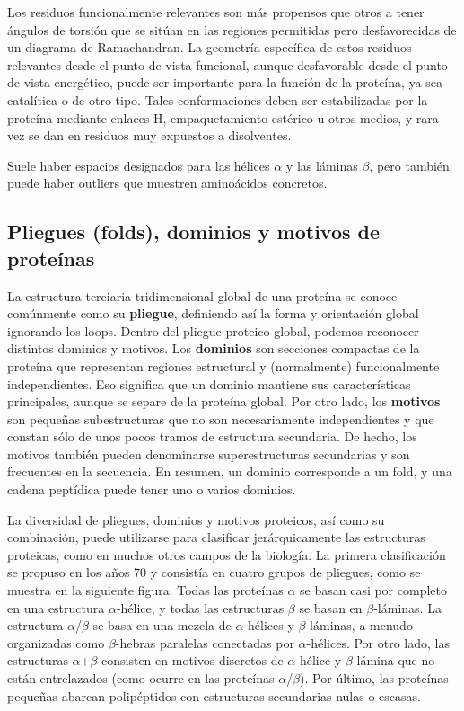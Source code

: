 Los residuos funcionalmente relevantes son más propensos que otros a tener ángulos de torsión que se sitúan en las regiones permitidas pero desfavorecidas de un diagrama de Ramachandran. La geometría específica de estos residuos relevantes desde el punto de vista funcional, aunque desfavorable desde el punto de vista energético, puede ser importante para la función de la proteína, ya sea catalítica o de otro tipo. Tales conformaciones deben ser estabilizadas por la proteína mediante enlaces H, empaquetamiento estérico u otros medios, y rara vez se dan en residuos muy expuestos a disolventes.

Suele haber espacios designados para las hélices $\alpha$ y las láminas $\beta$, pero también puede haber outliers que muestren aminoácidos concretos.

\subsection{Pliegues (folds), dominios y motivos de proteínas}
La estructura terciaria tridimensional global de una proteína se conoce comúnmente como su \textbf{pliegue}, definiendo así la forma y orientación global ignorando los loops. Dentro del pliegue proteico global, podemos reconocer distintos dominios y motivos. Los \textbf{dominios} son secciones compactas de la proteína que representan regiones estructural y (normalmente) funcionalmente independientes. Eso significa que un dominio mantiene sus características principales, aunque se separe de la proteína global. Por otro lado, los \textbf{motivos} son pequeñas subestructuras que no son necesariamente independientes y que constan sólo de unos pocos tramos de estructura secundaria. De hecho, los motivos también pueden denominarse superestructuras secundarias y son frecuentes en la secuencia. En resumen, un dominio corresponde a un fold, y una cadena peptídica puede tener uno o varios dominios.

La diversidad de pliegues, dominios y motivos proteicos, así como su combinación, puede utilizarse para clasificar jerárquicamente las estructuras proteicas, como en muchos otros campos de la biología. La primera clasificación se propuso en los años 70 y consistía en cuatro grupos de pliegues, como se muestra en la siguiente figura. Todas las proteínas $\alpha$ se basan casi por completo en una estructura $\alpha$-hélice, y todas las estructuras $\beta$ se basan en $\beta$-láminas. La estructura $\alpha$/$\beta$ se basa en una mezcla de $\alpha$-hélices y $\beta$-láminas, a menudo organizadas como $\beta$-hebras paralelas conectadas por $\alpha$-hélices. Por otro lado, las estructuras $\alpha$+$\beta$ consisten en motivos discretos de $\alpha$-hélice y $\beta$-lámina que no están entrelazados (como ocurre en las proteínas $\alpha$/$\beta$). Por último, las proteínas pequeñas abarcan polipéptidos con estructuras secundarias nulas o escasas.